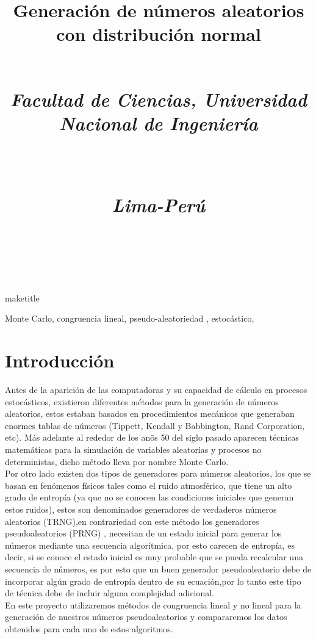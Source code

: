 \documentclass[conference]{IEEEtran}
\begin{document}
\title{Generaci\'on de n\'umeros aleatorios con distribuci\'on normal\\
\\
\centerline{\textit{Facultad de Ciencias, Universidad Nacional de Ingenier\'ia}}\\
\centerline{\textit{Lima-Per\'u}}\\
\author{}
}
maketitle
\begin{abstract}

\end{abstract}
\begin{IEEEkeywords}
Monte Carlo, congruencia lineal, pseudo-aleatoriedad , estoc\'astico, 
\end{IEEEkeywords}

\section{Introducci\'on}
Antes de la aparici\'on de las computadoras y su capacidad de c\'alculo en procesos estoc\'asticos, existieron diferentes m\'etodos para la generaci\'on de n\'umeros aleatorios, estos estaban basados en procedimientos mec\'anicos que generaban enormes tablas de n\'umeros (Tippett, Kendall y Babbington, Rand Corporation, etc). M\'as adelante al rededor de los an\~os 50 del siglo pasado aparecen t\'ecnicas matem\'aticas para la simulaci\'on de variables aleatorias y procesos no deterministas, dicho m\'etodo lleva por nombre Monte Carlo.\\
Por otro lado existen dos tipos de generadores para n\'umeros aleatorios, los que se basan en fen\'omenos f\'isicos tales como el ruido atmosf\'erico, que tiene un alto grado de entrop\'ia (ya que no se conocen las condiciones iniciales que generan estos ruidos), estos son denominados generadores de verdaderos n\'umeros aleatorios (TRNG),en contrariedad con este m\'etodo los generadores pseudoaleatorios (PRNG) \cite{b1}, necesitan de un estado inicial para generar los n\'umeros mediante una secuencia algor\'itmica, por esto carecen de entrop\'ia, es decir, si se conoce el estado inicial es muy probable que se pueda recalcular una secuencia de n\'umeros, es por esto que un buen generador pseudoaleatorio debe de incorporar alg\'un grado de entrop\'ia dentro de su ecuaci\'on,por lo tanto este tipo de t\'ecnica debe de incluir alguna complejidad adicional.\\
En este proyecto utilizaremos m\'etodos de congruencia lineal y no lineal\cite{b2} para la generaci\'on de nuestros n\'umeros pseudoaleatorios y compararemos los datos obtenidos para cada uno de estos algoritmos.
\end{document}
